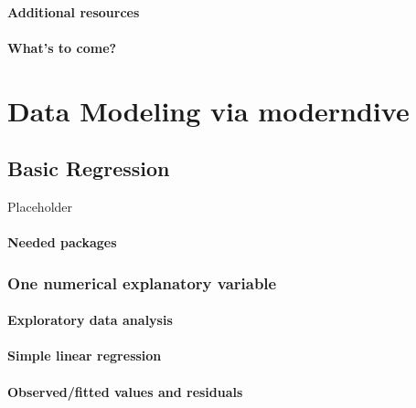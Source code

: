 \documentclass[
  12pt, krantz2,
]{krantz}
\begin{document}
\hypertarget{additional-resources-3}{%
\subsection{Additional resources}\label{additional-resources-3}}

\hypertarget{whats-to-come-2}{%
\subsection{What's to come?}\label{whats-to-come-2}}

\hypertarget{part-data-modeling-via-moderndive}{%
\part{Data Modeling via moderndive}\label{part-data-modeling-via-moderndive}}

\hypertarget{regression}{%
\chapter{Basic Regression}\label{regression}}

Placeholder

\hypertarget{needed-packages-3}{%
\subsection*{Needed packages}\label{needed-packages-3}}


\hypertarget{model1}{%
\section{One numerical explanatory variable}\label{model1}}

\hypertarget{model1EDA}{%
\subsection{Exploratory data analysis}\label{model1EDA}}

\hypertarget{model1table}{%
\subsection{Simple linear regression}\label{model1table}}

\hypertarget{model1points}{%
\subsection{Observed/fitted values and residuals}\label{model1points}}
\end{document}
